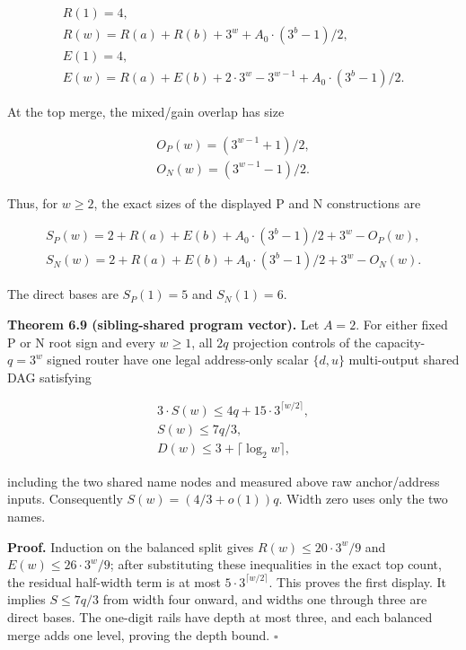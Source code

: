 \documentclass[
  11pt,
]{article}
\theoremstyle{definition}
\theoremstyle{remark}
\begin{document}
\[
\begin{aligned}
R(1)=4, \\
R(w)=R(a)+R(b)+3^w+A_0\mathbin{\cdot}(3^b-1)/2, \\
E(1)=4, \\
E(w)=R(a)+E(b)+2\mathbin{\cdot}3^w-3^{w-1}+A_0\mathbin{\cdot}(3^b-1)/2.
\end{aligned}
\]

At the top merge, the mixed/gain overlap has size

\[
\begin{aligned}
O_P(w)=(3^{w-1}+1)/2, \\
O_N(w)=(3^{w-1}-1)/2.
\end{aligned}
\]

Thus, for \(w\ge 2\), the exact sizes of the displayed P and N
constructions are

\[
\begin{aligned}
S_P(w)=2+R(a)+E(b)+A_0\mathbin{\cdot}(3^b-1)/2+3^w-O_P(w), \\
S_N(w)=2+R(a)+E(b)+A_0\mathbin{\cdot}(3^b-1)/2+3^w-O_N(w).
\end{aligned}
\]

The direct bases are \(S_P(1)=5\) and \(S_N(1)=6\).

\textbf{Theorem 6.9 (sibling-shared program vector).} Let \(A=2\). For
either fixed P or N root sign and every \(w\ge 1\), all \(2q\)
projection controls of the capacity-\(q=3^w\) signed router have one
legal address-only scalar \(\{d,u\}\) multi-output shared DAG satisfying

\[
\begin{aligned}
3\mathbin{\cdot}S(w) \le  4q+15\mathbin{\cdot}3^{\lceil w/2 \rceil}, \\
S(w)   \le  7q/3, \\
D(w)   \le  3+\lceil \log_2 w \rceil,
\end{aligned}
\]

including the two shared name nodes and measured above raw
anchor/address inputs. Consequently \(S(w)=(4/3+o(1))q\). Width zero
uses only the two names.

\textbf{Proof.} Induction on the balanced split gives
\(R(w)\le 20\mathbin{\cdot}3^w/9\) and
\(E(w)\le 26\mathbin{\cdot}3^w/9\); after substituting these
inequalities in the exact top count, the residual half-width term is at
most \(5\mathbin{\cdot}3^{\lceil w/2 \rceil}\). This proves the first
display. It implies \(S\le 7q/3\) from width four onward, and widths one
through three are direct bases. The one-digit rails have depth at most
three, and each balanced merge adds one level, proving the depth bound.
\(\square\)
\end{document}
